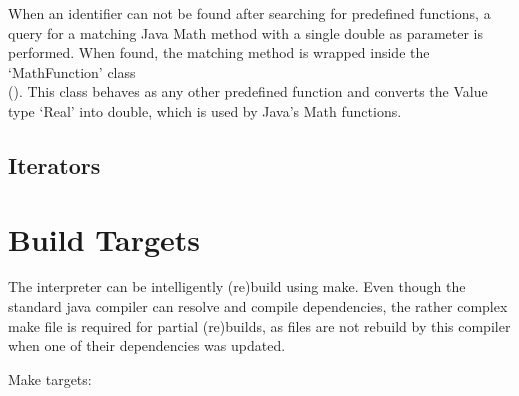 When an identifier can not be found after searching for predefined functions, a query for a matching Java Math method with a single double as parameter is performed. When found, the matching method is wrapped inside the `MathFunction' class\\ (). This class behaves as any other predefined function and converts the \setlX{} Value type `Real' into double, which is used by Java's Math functions.
\subsection{Iterators}


\section{Build Targets}

The interpreter can be intelligently (re)build using make. Even though the standard java compiler can resolve and compile dependencies, the rather complex make file is required for partial (re)builds, as files are not rebuild by this compiler when one of their dependencies was updated.

Make targets:

